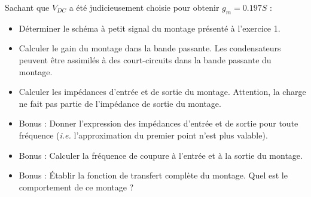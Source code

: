 \documentclass{../../template/tp}
\begin{document}
\Question
{
Sachant que $V_{DC}$ a été judicieusement choisie pour obtenir $g_m=0.197S$ :
 
 \begin{itemize}
 \item Déterminer le schéma à petit signal du montage présenté à l'exercice 1.
 \item Calculer le gain du montage dans la bande passante. Les condensateurs peuvent être assimilés à des court-circuits dans la bande passante du montage.
 \item Calculer les impédances d'entrée et de sortie du montage. Attention, la charge ne fait pas partie de l'impédance de sortie du montage.
 \item Bonus : Donner l'expression des impédances d'entrée et de sortie pour toute fréquence (\textit{i.e.} l'approximation du premier point n'est plus valable).
 \item Bonus : Calculer la fréquence de coupure à l'entrée et à la sortie du montage.
 \item Bonus : Établir la fonction de transfert complète du montage. Quel est le comportement de ce montage ?
 \end{itemize}

}
\end{document}
